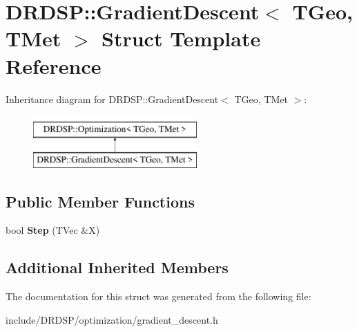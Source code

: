 \hypertarget{struct_d_r_d_s_p_1_1_gradient_descent}{\section{D\-R\-D\-S\-P\-:\-:Gradient\-Descent$<$ T\-Geo, T\-Met $>$ Struct Template Reference}
\label{struct_d_r_d_s_p_1_1_gradient_descent}
}
Inheritance diagram for D\-R\-D\-S\-P\-:\-:Gradient\-Descent$<$ T\-Geo, T\-Met $>$\-:\begin{figure}[H]
\begin{center}
\leavevmode
\includegraphics[height=2.000000cm]{struct_d_r_d_s_p_1_1_gradient_descent}
\end{center}
\end{figure}
\subsection*{Public Member Functions}
\begin{DoxyCompactItemize}
\item 
\hypertarget{struct_d_r_d_s_p_1_1_gradient_descent_a3e383660a94762cbee8bf8713c419dda}{bool {\bfseries Step} (T\-Vec \&X)}\label{struct_d_r_d_s_p_1_1_gradient_descent_a3e383660a94762cbee8bf8713c419dda}

\end{DoxyCompactItemize}
\subsection*{Additional Inherited Members}


The documentation for this struct was generated from the following file\-:\begin{DoxyCompactItemize}
\item 
include/\-D\-R\-D\-S\-P/optimization/gradient\-\_\-descent.\-h\end{DoxyCompactItemize}
